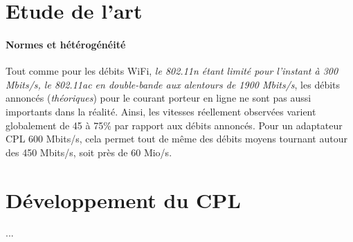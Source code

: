     \section{Etude de l’art}
            \paragraph{Normes et hétérogénéité}
Tout comme pour les débits WiFi, \emph{ le \emph{802.11n} étant limité pour l'instant à 300 Mbits/s, le \emph{802.11ac} en double-bande aux alentours de 1900 Mbits/s}, les débits annoncés (\emph{théoriques}) pour le courant porteur en ligne ne sont pas aussi importants dans la réalité.
Ainsi, les vitesses réellement observées varient globalement de 45 à 75\% par rapport aux débits annoncés.
Pour un adaptateur CPL 600 Mbits/s, cela permet tout de même des débits moyens tournant autour des 450 Mbits/s, soit près de 60 Mio/s.

    \section{Développement du CPL}
        ...

